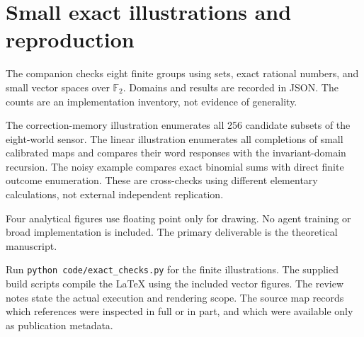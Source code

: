 \documentclass[11pt,letterpaper]{article}
\theoremstyle{plain}
\theoremstyle{definition}
\begin{document}
\section{Small exact illustrations and reproduction}\label{app:checks}
The companion checks eight finite groups using sets, exact rational numbers, and small vector spaces over $\mathbb F_2$. Domains and results are recorded in JSON. The counts are an implementation inventory, not evidence of generality.

The correction-memory illustration enumerates all 256 candidate subsets of the eight-world sensor. The linear illustration enumerates all completions of small calibrated maps and compares their word responses with the invariant-domain recursion. The noisy example compares exact binomial sums with direct finite outcome enumeration. These are cross-checks using different elementary calculations, not external independent replication.

Four analytical figures use floating point only for drawing. No agent training or broad implementation is included. The primary deliverable is the theoretical manuscript.

Run \texttt{python code/exact\_checks.py} for the finite illustrations. The supplied build scripts compile the LaTeX using the included vector figures. The review notes state the actual execution and rendering scope. The source map records which references were inspected in full or in part, and which were available only as publication metadata.
\end{document}
